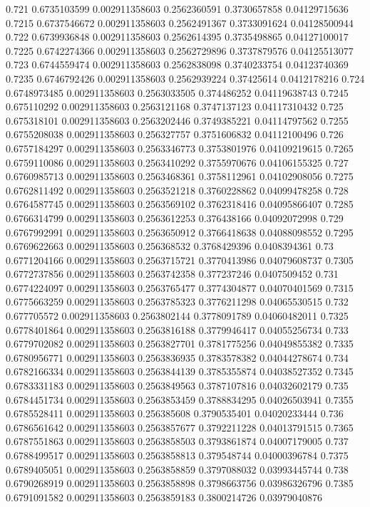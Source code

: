 {0.721 0.6735103599 0.002911358603 0.2562360591 0.3730657858 0.04129715636
0.7215 0.6737546672 0.002911358603 0.2562491367 0.3733091624 0.04128500944
0.722 0.6739936848 0.002911358603 0.2562614395 0.3735498865 0.04127100017
0.7225 0.6742274366 0.002911358603 0.2562729896 0.3737879576 0.04125513077
0.723 0.6744559474 0.002911358603 0.2562838098 0.3740233754 0.04123740369
0.7235 0.6746792426 0.002911358603 0.2562939224 0.37425614 0.0412178216
0.724 0.6748973485 0.002911358603 0.2563033505 0.374486252 0.04119638743
0.7245 0.675110292 0.002911358603 0.2563121168 0.3747137123 0.04117310432
0.725 0.675318101 0.002911358603 0.2563202446 0.3749385221 0.04114797562
0.7255 0.6755208038 0.002911358603 0.256327757 0.3751606832 0.04112100496
0.726 0.6757184297 0.002911358603 0.2563346773 0.3753801976 0.04109219615
0.7265 0.6759110086 0.002911358603 0.2563410292 0.3755970676 0.04106155325
0.727 0.6760985713 0.002911358603 0.2563468361 0.3758112961 0.04102908056
0.7275 0.6762811492 0.002911358603 0.2563521218 0.3760228862 0.04099478258
0.728 0.6764587745 0.002911358603 0.2563569102 0.3762318416 0.04095866407
0.7285 0.6766314799 0.002911358603 0.2563612253 0.376438166 0.04092072998
0.729 0.6767992991 0.002911358603 0.2563650912 0.3766418638 0.04088098552
0.7295 0.6769622663 0.002911358603 0.256368532 0.3768429396 0.0408394361
0.73 0.6771204166 0.002911358603 0.2563715721 0.3770413986 0.04079608737
0.7305 0.6772737856 0.002911358603 0.2563742358 0.377237246 0.0407509452
0.731 0.6774224097 0.002911358603 0.2563765477 0.3774304877 0.04070401569
0.7315 0.6775663259 0.002911358603 0.2563785323 0.3776211298 0.04065530515
0.732 0.677705572 0.002911358603 0.2563802144 0.3778091789 0.04060482011
0.7325 0.6778401864 0.002911358603 0.2563816188 0.3779946417 0.04055256734
0.733 0.6779702082 0.002911358603 0.2563827701 0.3781775256 0.04049855382
0.7335 0.6780956771 0.002911358603 0.2563836935 0.3783578382 0.04044278674
0.734 0.6782166334 0.002911358603 0.2563844139 0.3785355874 0.04038527352
0.7345 0.6783331183 0.002911358603 0.2563849563 0.3787107816 0.04032602179
0.735 0.6784451734 0.002911358603 0.2563853459 0.3788834295 0.04026503941
0.7355 0.6785528411 0.002911358603 0.256385608 0.3790535401 0.04020233444
0.736 0.6786561642 0.002911358603 0.2563857677 0.3792211228 0.04013791515
0.7365 0.6787551863 0.002911358603 0.2563858503 0.3793861874 0.04007179005
0.737 0.6788499517 0.002911358603 0.2563858813 0.379548744 0.04000396784
0.7375 0.6789405051 0.002911358603 0.2563858859 0.3797088032 0.03993445744
0.738 0.6790268919 0.002911358603 0.2563858898 0.3798663756 0.03986326796
0.7385 0.6791091582 0.002911358603 0.2563859183 0.3800214726 0.03979040876
}
